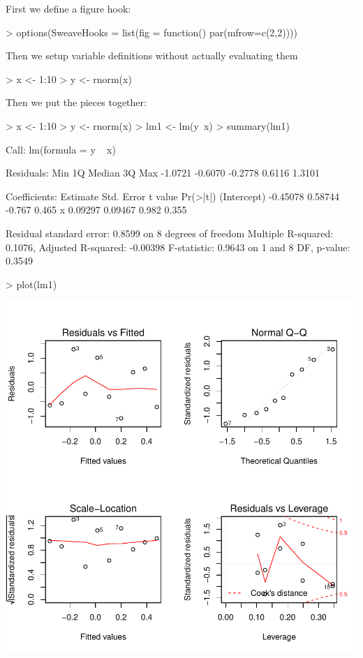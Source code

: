 \documentclass[a4paper]{article}
\begin{document}



First we define a figure hook:
\begin{Schunk}
\begin{Sinput}
> options(SweaveHooks = list(fig = function() par(mfrow=c(2,2))))
\end{Sinput}
\end{Schunk}

Then we setup variable definitions without actually evaluating them
\begin{Schunk}
\begin{Sinput}
> x <- 1:10
> y <- rnorm(x)
\end{Sinput}
\end{Schunk}


Then we put the pieces together:
\begin{center}
\begin{Schunk}
\begin{Sinput}
> x <- 1:10
> y <- rnorm(x)
> lm1 <- lm(y~x)
> summary(lm1)
\end{Sinput}
\begin{Soutput}
Call:
lm(formula = y ~ x)

Residuals:
    Min      1Q  Median      3Q     Max 
-1.0721 -0.6070 -0.2778  0.6116  1.3101 

Coefficients:
            Estimate Std. Error t value Pr(>|t|)
(Intercept) -0.45078    0.58744  -0.767    0.465
x            0.09297    0.09467   0.982    0.355

Residual standard error: 0.8599 on 8 degrees of freedom
Multiple R-squared: 0.1076,	Adjusted R-squared: -0.00398 
F-statistic: 0.9643 on 1 and 8 DF,  p-value: 0.3549 
\end{Soutput}
\begin{Sinput}
> plot(lm1)
\end{Sinput}
\end{Schunk}
\includegraphics{test-003}
\end{center}
\end{document}
